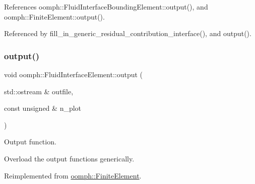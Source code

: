 References oomph\+::\+Fluid\+Interface\+Bounding\+Element\+::output(), and oomph\+::\+Finite\+Element\+::output().



Referenced by fill\+\_\+in\+\_\+generic\+\_\+residual\+\_\+contribution\+\_\+interface(), and output().

\mbox{\label{classoomph_1_1FluidInterfaceElement_a213b1a40132a9605ee8bd31c88b225e0}} 
\subsubsection{\texorpdfstring{output()}{output()}\hspace{0.1cm}{\footnotesize\ttfamily [2/4]}}
{\footnotesize\ttfamily void oomph\+::\+Fluid\+Interface\+Element\+::output (\begin{DoxyParamCaption}\item[{std\+::ostream \&}]{outfile,  }\item[{const unsigned \&}]{n\+\_\+plot }\end{DoxyParamCaption})\hspace{0.3cm}{\ttfamily [virtual]}}



Output function. 

Overload the output functions generically. 

Reimplemented from \hyperlink{classoomph_1_1FiniteElement_afa9d9b2670f999b43e6679c9dd28c457}{oomph\+::\+Finite\+Element}.



